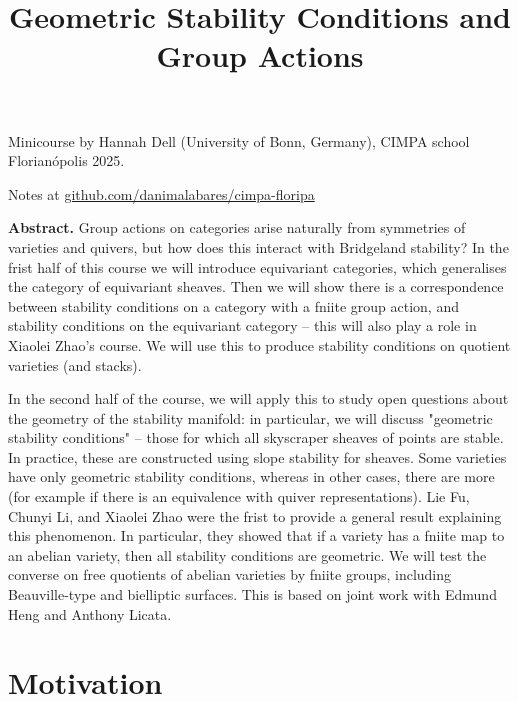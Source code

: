 


\title{Geometric Stability Conditions and Group Actions}
\maketitle

Minicourse by Hannah Dell (University of Bonn, Germany), CIMPA school
Florianópolis 2025.

Notes at 
\href{http://github.com/danimalabares/cimpa-floripa}
{github.com/danimalabares/cimpa-floripa}

\bigskip\noindent

{\bf Abstract.} Group actions on categories arise naturally from symmetries of
varieties and quivers, but how does this interact with Bridgeland stability? In
the frist half of this course we will introduce equivariant categories, which
generalises the category of equivariant sheaves. Then we will show there is a
correspondence between stability conditions on a category with a fniite group
action, and stability conditions on the equivariant category – this will also
play a role in Xiaolei Zhao’s course. We will use this to produce stability
conditions on quotient varieties (and stacks).

In the second half of the course, we will apply this to study open questions
about the geometry of the stability manifold: in particular, we will discuss
"geometric stability conditions" – those for which all skyscraper sheaves of
points are stable. In practice, these are constructed using slope stability for
sheaves. Some varieties have only geometric stability conditions, whereas in
other cases, there are more (for example if there is an equivalence with quiver
representations). Lie Fu, Chunyi Li, and Xiaolei Zhao were the frist to provide
a general result explaining this phenomenon. In particular, they showed that if
a variety has a fniite map to an abelian variety, then all stability conditions
are geometric. We will test the converse on free quotients of abelian varieties
by fniite groups, including Beauville-type and bielliptic surfaces. This is
based on joint work with Edmund Heng and Anthony Licata. 

\bigskip\noindent
\tableofcontents
\bigskip\noindent

\section*{Motivation}
\label{section-motivation}

